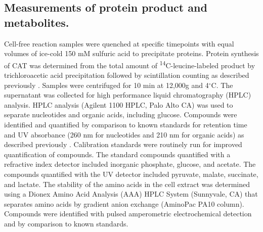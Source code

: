 \documentclass[journal=asbcd6,manuscript=article]{achemso}
\begin{document}
\subsection*{Measurements of protein product and metabolites.}
Cell-free reaction samples were quenched at specific timepoints with equal volumes of ice-cold 150 mM sulfuric acid to precipitate proteins.
Protein synthesis of CAT was determined from the total amount of \textsuperscript{14}C-leucine-labeled product by trichloroacetic acid precipitation followed by scintillation counting as described previously \cite{2005_calhoun_BiotechnologyProgress}.
Samples were centrifuged for 10 min at 12,000g and 4$^{\circ}$C.
The supernatant was collected for high performance liquid chromatography (HPLC) analysis.
HPLC analysis (Agilent 1100 HPLC, Palo Alto CA) was used to separate nucleotides and organic acids, including glucose. Compounds were identified and quantified by comparison to known standards for retention time and UV absorbance (260 nm for nucleotides and 210 nm for organic acids) as described previously \cite{2005_calhoun_BiotechnologyProgress}.
Calibration standards were routinely run for improved quantification of compounds.
The standard compounds quantified with a refractive index detector included inorganic phosphate, glucose, and acetate.
The compounds quantified with the UV detector included pyruvate, malate, succinate, and lactate.
The stability of the amino acids in the cell extract was determined using a Dionex Amino Acid Analysis (AAA) HPLC System (Sunnyvale, CA) that separates amino acids by gradient anion exchange (AminoPac PA10 column).
Compounds were identified with pulsed amperometric electrochemical detection and by comparison to known standards.
\end{document}
